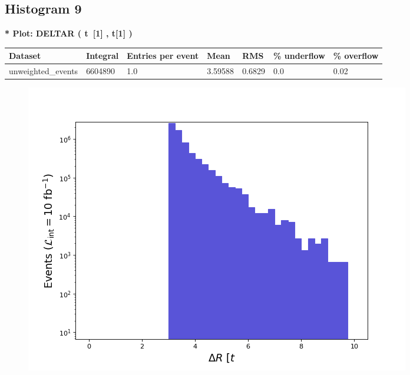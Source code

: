 \documentclass[a4paper, 10pt]{article}
\begin{document}
\subsection{ Histogram 9}

\textbf{* Plot: DELTAR ( t~[1] , t[1] ) }\\
   \begin{table}[H]
  \begin{center}
    \begin{tabular}{|m{23.0mm}|m{23.0mm}|m{18.0mm}|m{19.0mm}|m{19.0mm}|m{19.0mm}|m{19.0mm}|}
      \hline
      {\cellcolor{yellow}         Dataset}& {\cellcolor{yellow}         Integral}& {\cellcolor{yellow}         Entries per event}& {\cellcolor{yellow}         Mean}& {\cellcolor{yellow}         RMS}& {\cellcolor{yellow}         \% underflow}& {\cellcolor{yellow}         \% overflow}\\
      \hline
      {\cellcolor{white}         unweighted\_events}& {\cellcolor{white}         6604890}& {\cellcolor{white}         1.0}& {\cellcolor{white}         3.59588}& {\cellcolor{white}         0.6829}& {\cellcolor{green}         0.0}& {\cellcolor{green}         0.02}\\
\hline
    \end{tabular}
  \end{center}
\end{table}

\begin{figure}[H]
  \begin{center}
    \includegraphics[scale=0.45]{selection_8.png}\\
\caption{   }
  \end{center}
\end{figure}
      
\end{document}
